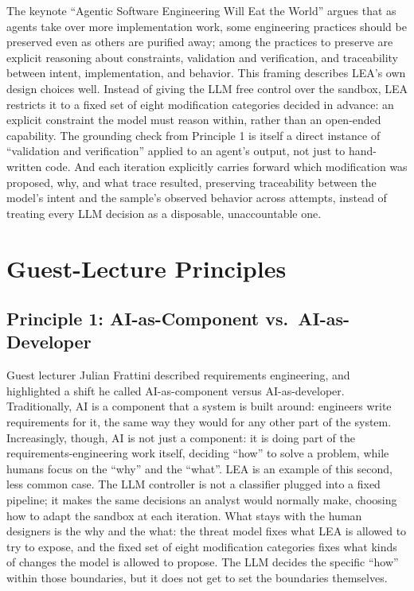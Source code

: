\documentclass[11pt,a4paper]{article}
\begin{document}
The keynote ``Agentic Software Engineering Will Eat the World'' argues that as agents take over more implementation work, some engineering practices should be preserved even as others are purified away; among the practices to preserve are explicit reasoning about constraints, validation and verification, and traceability between intent, implementation, and behavior.
This framing describes LEA's own design choices well.
Instead of giving the LLM free control over the sandbox, LEA restricts it to a fixed set of eight modification categories decided in advance: an explicit constraint the model must reason within, rather than an open-ended capability.
The grounding check from Principle 1 is itself a direct instance of ``validation and verification'' applied to an agent's output, not just to hand-written code.
And each iteration explicitly carries forward which modification was proposed, why, and what trace resulted, preserving traceability between the model's intent and the sample's observed behavior across attempts, instead of treating every LLM decision as a disposable, unaccountable one.

\section{Guest-Lecture Principles}

\subsection{Principle 1: AI-as-Component vs.\ AI-as-Developer}

Guest lecturer Julian Frattini described requirements engineering, and highlighted a shift he called AI-as-component versus AI-as-developer.
Traditionally, AI is a component that a system is built around: engineers write requirements for it, the same way they would for any other part of the system.
Increasingly, though, AI is not just a component: it is doing part of the requirements-engineering work itself, deciding ``how'' to solve a problem, while humans focus on the ``why'' and the ``what''.
LEA is an example of this second, less common case.
The LLM controller is not a classifier plugged into a fixed pipeline; it makes the same decisions an analyst would normally make, choosing how to adapt the sandbox at each iteration.
What stays with the human designers is the why and the what: the threat model fixes what LEA is allowed to try to expose, and the fixed set of eight modification categories fixes what kinds of changes the model is allowed to propose.
The LLM decides the specific ``how'' within those boundaries, but it does not get to set the boundaries themselves.
\end{document}

